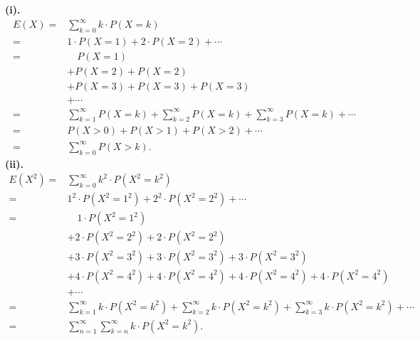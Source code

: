 \documentclass[en, normal, 11pt, black]{elegantnote}
\renewenvironment{proof}{\begin{tcolorbox}[colback=white, colframe=black!50, breakable, title=Proof. ]\setlength{\parskip}{0.8em}}{\,\\\rightline{$\square$}\end{tcolorbox}}
\begin{document}
    \begin{proof}
        \bfseries{(i). }
        \[
            \begin{aligned}
                E(X)=&\sum_{k=0}^\infty k\cdot P(X=k)\\
                =&1\cdot P(X=1)+2\cdot P(X=2)+\cdots\\
                =&\quad P(X=1)\\
                &+P(X=2)+P(X=2)\\
                &+P(X=3)+P(X=3)+P(X=3)\\
                &+\cdots\\
                =&\sum_{k=1}^\infty P(X=k)+\sum_{k=2}^\infty P(X=k)+\sum_{k=3}^\infty P(X=k)+\cdots\\
                =&P(X>0)+P(X>1)+P(X>2)+\cdots\\
                =&\sum_{k=0}^\infty P(X>k). 
            \end{aligned}
        \]
        \bfseries{(ii). }
        \[
            \begin{aligned}
                E(X^2)=&\sum_{k=0}^\infty k^2\cdot P(X^2=k^2)\\
                =&1^2\cdot P(X^2=1^2)+2^2\cdot P(X^2=2^2)+\cdots\\
                =&\quad1\cdot P(X^2=1^2)\\
                &+2\cdot P(X^2=2^2)+2\cdot P(X^2=2^2)\\
                &+3\cdot P(X^2=3^2)+3\cdot P(X^2=3^2)+3\cdot P(X^2=3^2)\\
                &+4\cdot P(X^2=4^2)+4\cdot P(X^2=4^2)+4\cdot P(X^2=4^2)+4\cdot P(X^2=4^2)\\
                &+\cdots\\
                =&\sum_{k=1}^\infty k\cdot P(X^2=k^2)+\sum_{k=2}^\infty k\cdot P(X^2=k^2)+\sum_{k=3}^\infty k\cdot P(X^2=k^2)+\cdots\\
                =&\sum_{n=1}^\infty\sum_{k=n}^\infty k\cdot P(X^2=k^2). 
            \end{aligned}
        \]
    \end{proof}
\end{document}
